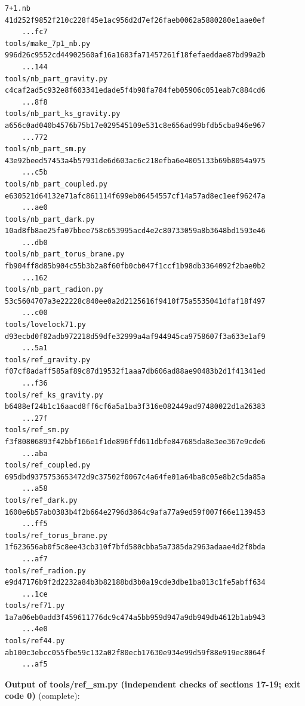 \documentclass[10pt,a4paper]{article}
\begin{document}
\begin{Verbatim}[fontsize=\small,frame=single,framesep=2mm]
7+1.nb                             41d252f9852f210c228f45e1ac956d2d7ef26faeb0062a5880280e1aae0ef
    ...fc7
tools/make_7p1_nb.py               996d26c9552cd44902560af16a1683fa71457261f18fefaeddae87bd99a2b
    ...144
tools/nb_part_gravity.py           c4caf2ad5c932e8f603341edade5f4b98fa784feb05906c051eab7c884cd6
    ...8f8
tools/nb_part_ks_gravity.py        a656c0ad040b4576b75b17e029545109e531c8e656ad99bfdb5cba946e967
    ...772
tools/nb_part_sm.py                43e92beed57453a4b57931de6d603ac6c218efba6e4005133b69b8054a975
    ...c5b
tools/nb_part_coupled.py           e630521d64132e71afc861114f699eb06454557cf14a57ad8ec1eef96247a
    ...ae0
tools/nb_part_dark.py              10ad8fb8ae25fa07bbee758c653995acd4e2c80733059a8b3648bd1593e46
    ...db0
tools/nb_part_torus_brane.py       fb904ff8d85b904c55b3b2a8f60fb0cb047f1ccf1b98db3364092f2bae0b2
    ...162
tools/nb_part_radion.py            53c5604707a3e22228c840ee0a2d2125616f9410f75a5535041dfaf18f497
    ...c00
tools/lovelock71.py                d93ecbd0f82adb972218d59dfe32999a4af944945ca9758607f3a633e1af9
    ...5a1
tools/ref_gravity.py               f07cf8adaff585af89c87d19532f1aaa7db606ad88ae90483b2d1f41341ed
    ...f36
tools/ref_ks_gravity.py            b6488ef24b1c16aacd8ff6cf6a5a1ba3f316e082449ad97480022d1a26383
    ...27f
tools/ref_sm.py                    f3f80806893f42bbf166e1f1de896ffd611dbfe847685da8e3ee367e9cde6
    ...aba
tools/ref_coupled.py               695dbd9375753653472d9c37502f0067c4a64fe01a64ba8c05e8b2c5da85a
    ...a58
tools/ref_dark.py                  1600e6b57ab0383b4f2b664e2796d3864c9afa77a9ed59f007f66e1139453
    ...ff5
tools/ref_torus_brane.py           1f623656ab0f5c8ee43cb310f7bfd580cbba5a7385da2963adaae4d2f8bda
    ...af7
tools/ref_radion.py                e9d47176b9f2d2232a84b3b82188bd3b0a19cde3dbe1ba013c1fe5abff634
    ...1ce
tools/ref71.py                     1a7a06eb0add3f459611776dc9c474a5bb959d947a9db949db4612b1ab943
    ...4e0
tools/ref44.py                     ab100c3ebcc055fbe59c132a02f80ecb17630e934e99d59f88e919ec8064f
    ...af5
\end{Verbatim}
\textbf{Output of tools/ref\_sm.py (independent checks of sections 17-19; exit code 0)} (complete):
\end{document}
